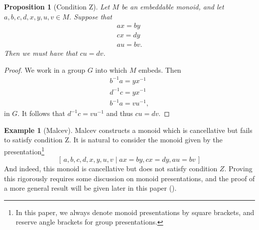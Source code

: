 \documentclass{article}
\theoremstyle{plain}
\newtheorem{prop}[thm]{Proposition}
\theoremstyle{definition}
\newtheorem{eg}[thm]{Example}
\begin{document}
	\begin{prop}[Condition Z]
		Let $M$ be an embeddable monoid, and let $a,b,c,d,x,y,u,v\in M$. Suppose that
		\begin{align*}
			ax=by\\
			cx = dy\\
			au= bv.
		\end{align*}
		Then we must have that $cu=dv$.
	\end{prop}
	\begin{proof}
		We work in a group $G$ into which $M$ embeds. Then
		\begin{align*}
			b^{-1}a=yx^{-1}\\
			d^{-1}c = yx^{-1}\\
			b^{-1}a= vu^{-1},
		\end{align*}
		in $G$.	It follows that $d^{-1}c = vu^{-1}$ and thus $cu=dv$.
	\end{proof}
	
	
	\begin{eg}[Malcev]
		Malcev constructs a monoid which is cancellative but fails to satisfy condition Z. It is natural to consider the monoid given by the presentation\footnote{In this paper, we always denote monoid presentations by square brackets, and reserve angle brackets for group presentations.}
		\[
			[\,a,b,c,d,x,y,u,v \mid ax=by,cx=dy, au= bv\,]
		\]
		And indeed, this monoid is cancellative but does not satisfy condition $Z$. Proving this rigorously requires some discussion on monoid presentations, and the proof of a more general result will be given later in this paper ({\color{red}{MISSING}}).
	\end{eg}
	
\end{document}
